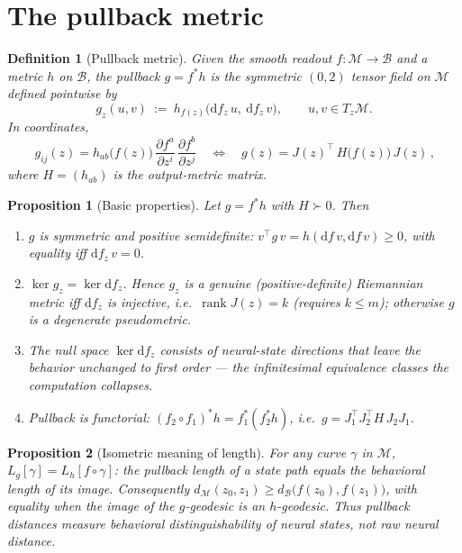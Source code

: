 \documentclass[11pt]{article}
\newtheorem{definition}{Definition}
\newtheorem{proposition}{Proposition}
\newcommand{\M}{\mathcal{M}}
\newcommand{\B}{\mathcal{B}}
\newcommand{\T}{T}
\newcommand{\rank}{\operatorname{rank}}
\newcommand{\dd}{\mathrm{d}}
\begin{document}
\section{The pullback metric}\label{sec:pullback}

\begin{definition}[Pullback metric]
Given the smooth readout $f:\M\to\B$ and a metric $h$ on $\B$, the \emph{pullback} $g=f^{*}h$
is the symmetric $(0,2)$ tensor field on $\M$ defined pointwise by
\[
  g_{z}(u,v)\ :=\ h_{f(z)}\big(\dd f_{z}\,u,\ \dd f_{z}\,v\big),
  \qquad u,v\in \T_{z}\M .
\]
In coordinates,
\[
  \boxed{\,g_{ij}(z)=h_{ab}\big(f(z)\big)\,\frac{\partial f^{a}}{\partial z^{i}}\,
                     \frac{\partial f^{b}}{\partial z^{j}}
        \quad\Longleftrightarrow\quad
        g(z)=J(z)^{\top}\,H\big(f(z)\big)\,J(z)\,,}
\]
where $H=(h_{ab})$ is the output-metric matrix.
\end{definition}

\begin{proposition}[Basic properties]\label{prop:props}
Let $g=f^{*}h$ with $H\succ0$. Then
\begin{enumerate}
\item[(i)] $g$ is symmetric and positive \emph{semi}definite: $v^{\top}g\,v=
      h(\dd f\,v,\dd f\,v)\ge 0$, with equality iff $\dd f_{z}\,v=0$.
\item[(ii)] $\ker g_{z}=\ker \dd f_{z}$. Hence $g_{z}$ is a genuine (positive-definite)
      Riemannian metric iff $\dd f_{z}$ is injective, i.e.\ $\rank J(z)=k$ (requires $k\le m$);
      otherwise $g$ is a \emph{degenerate} pseudometric.
\item[(iii)] The null space $\ker\dd f_{z}$ consists of neural-state directions that leave the
      behavior unchanged to first order --- the infinitesimal \emph{equivalence classes} the
      computation collapses.
\item[(iv)] Pullback is functorial: $(f_{2}\circ f_{1})^{*}h=f_{1}^{*}(f_{2}^{*}h)$, i.e.\
      $g=J_{1}^{\top}J_{2}^{\top}H\,J_{2}J_{1}$.
\end{enumerate}
\end{proposition}

\begin{proposition}[Isometric meaning of length]\label{prop:length}
For any curve $\gamma$ in $\M$, $L_{g}[\gamma]=L_{h}[f\circ\gamma]$: the pullback length of a
state path equals the behavioral length of its image. Consequently
$d_{\M}(z_{0},z_{1})\ge d_{\B}\big(f(z_{0}),f(z_{1})\big)$, with equality when the image of the
$g$-geodesic is an $h$-geodesic. Thus pullback distances measure \emph{behavioral
distinguishability of neural states}, not raw neural distance.
\end{proposition}
\end{document}
